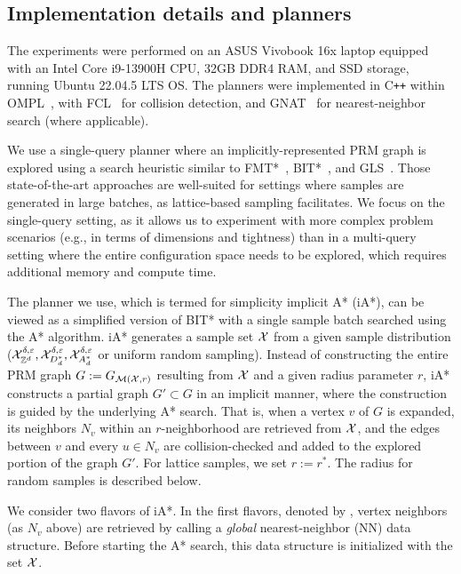 %   

\subsection{Implementation details and planners}
The experiments were performed on an ASUS Vivobook 16x laptop equipped with an Intel Core i9-13900H CPU, 32GB DDR4 RAM, and SSD storage, running Ubuntu 22.04.5 LTS OS.
The planners were implemented in C\texttt{++} within OMPL~\cite{sucan2012the-open-motion-planning-library}, with FCL~\cite{Pan2012FCL} for collision detection, and GNAT~\cite{gipson2013resolution} for nearest-neighbor search (where applicable).

We use a single-query planner where an implicitly-represented PRM graph is explored using a search heuristic similar to FMT*~\cite{JSCP15}, BIT*~\cite{GammellBS20}, and GLS~\cite{MandalikaCSS19}. Those state-of-the-art approaches are well-suited for settings where samples are generated in large batches, as lattice-based sampling facilitates. We focus on the single-query setting, as it allows us to experiment with more complex problem scenarios (e.g., in terms of dimensions and tightness) than in a multi-query setting where the entire configuration space needs to be explored, which requires additional memory and compute time. 

The planner we use, which is termed for simplicity implicit A* (iA*), can be viewed as a simplified version of BIT* with a single sample batch searched using the A* algorithm. iA* generates a sample set $\mathcal{X}$ from a given sample distribution  ($\mathcal{X}_{\mathbb{Z}^d}^{\delta,\varepsilon},\mathcal{X}_{D_d^*}^{\delta,\varepsilon},\mathcal{X}_{A_d^*}^{\delta,\varepsilon}$ or uniform random sampling). Instead of constructing the entire PRM graph $G:=G_{\mathcal{M}(\mathcal{X},r)}$ resulting from $\mathcal{X}$ and a given radius parameter $r$, iA* constructs a partial graph $G'\subset G$ in an implicit manner, where the construction is guided by the underlying A* search. That is, when a vertex $v$ of $G$ is expanded, its neighbors $N_v$ within an $r$-neighborhood are retrieved from $\mathcal{X}$, and the edges between $v$ and every $u\in N_v$ are collision-checked and added to the explored portion of the graph $G'$. For lattice samples, we set $r:=r^*$. The radius for random samples is described below. 

We consider two flavors of iA*. In the first flavors, 
denoted by \glo, vertex neighbors (as $N_v$ above) are retrieved by calling a \emph{global} nearest-neighbor (NN) data structure. Before starting the A* search, this data structure is initialized with the set $\mathcal{X}$. %

